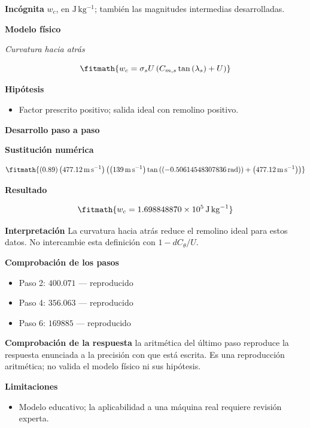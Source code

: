 \documentclass[10pt,openany]{book}
\begin{document}
\noindent\textbf{Incógnita}
$w_c$, en $\mathrm{J\,kg^{-1}}$; también las magnitudes intermedias desarrolladas.

\noindent\textbf{Modelo físico}

\noindent\textit{Curvatura hacia atrás}

\[
\fitmath{w_c=\sigma_s U \left(C_{m,s} \tan{\left(\lambda_s \right)} + U\right)}
\]

\noindent\textbf{Hipótesis}
\begin{itemize}
\item Factor prescrito positivo; salida ideal con remolino positivo.
\end{itemize}

\noindent\textbf{Desarrollo paso a paso}



\noindent\textbf{Sustitución numérica}

\[
\fitmath{\left(0.89\right) \left(477.12\,\mathrm{m}\,\mathrm{s}^{-1}\right) \left(\left(139\,\mathrm{m}\,\mathrm{s}^{-1}\right) \tan{\left(\left(-0.50614548307836\,\mathrm{rad}\right) \right)} + \left(477.12\,\mathrm{m}\,\mathrm{s}^{-1}\right)\right)}
\]

\noindent\textbf{Resultado}

\[
\fitmath{w_c=1.698848870\times10^{5}\,\mathrm{J}\,\mathrm{kg}^{-1}}
\]

\noindent\textbf{Interpretación}
La curvatura hacia atrás reduce el remolino ideal para estos datos. No intercambie esta definición con $1-dC_\theta/U$.

\noindent\textbf{Comprobación de los pasos}
\begin{itemize}
\item Paso 2: $400.071$ — reproducido
\item Paso 4: $356.063$ — reproducido
\item Paso 6: $169885$ — reproducido
\end{itemize}

\noindent\textbf{Comprobación de la respuesta} la aritmética del último paso reproduce la respuesta enunciada a la precisión con que está escrita. Es una reproducción aritmética; no valida el modelo físico ni sus hipótesis.

\noindent\textbf{Limitaciones}
\begin{itemize}
\item Modelo educativo; la aplicabilidad a una máquina real requiere revisión experta.
\end{itemize}
\end{document}
